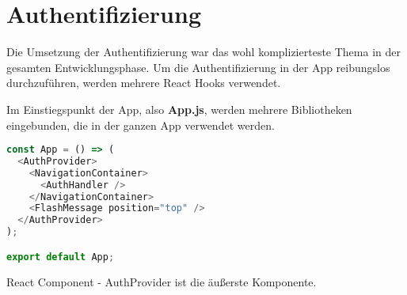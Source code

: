 \chapter{Authentifizierung}
Die Umsetzung der Authentifizierung war das wohl komplizierteste Thema in der gesamten
Entwicklungsphase. Um die Authentifizierung in der App reibungslos durchzuführen, werden mehrere
React Hooks verwendet.

Im Einstiegspunkt der App, also \textbf{App.js}, werden mehrere Bibliotheken eingebunden, die in der
ganzen App verwendet werden.

\begin{code}[htp]
\begin{lstlisting}[firstnumber=1,language=JavaScript, style=JSX]
const App = () => (
  <AuthProvider>
    <NavigationContainer>
      <AuthHandler />
    </NavigationContainer>
    <FlashMessage position="top" />
  </AuthProvider>
);

export default App;
\end{lstlisting}
\caption{React Component - AuthProvider ist die äußerste Komponente.}
\end{code}

\newpage


\newpage



